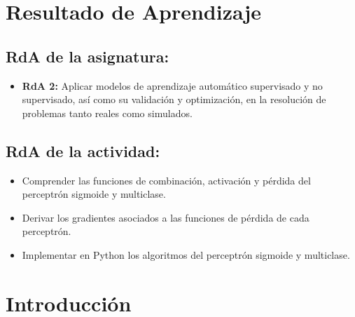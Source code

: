 \documentclass[a4,11pt]{aleph-notas}
\begin{document}
\encabezado


\section*{Resultado de Aprendizaje}

\subsection*{RdA de la asignatura:}
\begin{itemize}[leftmargin=*]
    \item \textbf{RdA 2:} Aplicar modelos de aprendizaje automático supervisado y no supervisado, así como su validación y optimización, en la resolución de problemas tanto reales como simulados.
\end{itemize}

\subsection*{RdA de la actividad:}
\begin{itemize}[leftmargin=*]
    \item Comprender las funciones de combinación, activación y pérdida del perceptrón sigmoide y multiclase.
    \item Derivar los gradientes asociados a las funciones de pérdida de cada perceptrón.
    \item Implementar en Python los algoritmos del perceptrón sigmoide y multiclase.
\end{itemize}

\section*{Introducción}
\end{document}
